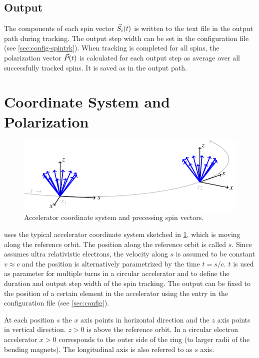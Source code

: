 \documentclass[a4paper]{scrartcl}
\begin{document}
\subsection{Output}
\label{sec:output}

The components of each spin vector $\svec[i](t)$ is written to the text file
 in the output path during tracking. The output step width
can be set in the configuration file (see \cref{sec:config-spintrk}). When tracking is
completed for all spins, the polarization vector $\pvec(t)$ is calculated for each output
step as average over all successfully tracked spins. It is saved as
 in the output path.



\section{Coordinate System and Polarization}
\label{sec:coord}

\begin{figure}
  \centering
  \includegraphics{coord}
  \caption{Accelerator coordinate system and precessing spin vectors. \cite{dr}}
  \label{fig:coord}
\end{figure}

\polem uses the typical accelerator coordinate system sketched in \cref{fig:coord}, which
is moving along the reference orbit. The position along the reference orbit is called $s$.
Since \polem assumes ultra relativistic electrons, the velocity along $s$ is assumed to be
constant $v\approx c$ and the position is alternatively parametrized by the time
$t = s/c$. $t$ is used as parameter for multiple turns in a circular accelerator and to
define the duration and output step width of the spin tracking. The output can be fixed to
the position of a certain element in the accelerator using the entry
 in the configuration file (see \cref{sec:config}).

At each position $s$ the $x$ axis points in horizontal direction and the $z$ axis points
in vertical direction. $z>0$ is above the reference orbit. In a circular electron
accelerator $x>0$ corresponds to the outer side of the ring (to larger radii of the
bending magnets). The longitudinal axis is also referred to as $s$ axis.
\end{document}

